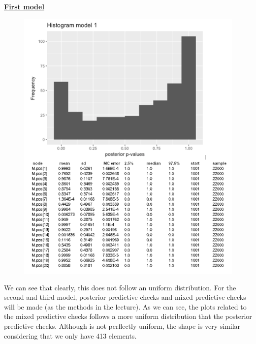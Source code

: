 \documentclass{article}
\begin{document}
\underline{\textbf{First model}}
\begin{figure}[ht!]
\centering
\includegraphics[width=14cm]{figures/model1_pospred.png}
\end{figure}

We can see that clearly, this does not follow an uniform distribution. For the second and third model, posterior predictive checks and mixed predictive checks will be made (as the methods in the lecture). As we can see, the plots related to the mixed predictive checks follows a more uniform distribution that the posterior predictive checks. Although is not perflectly uniform, the shape is very similar considering that we only have 413 elements.
\end{document}
